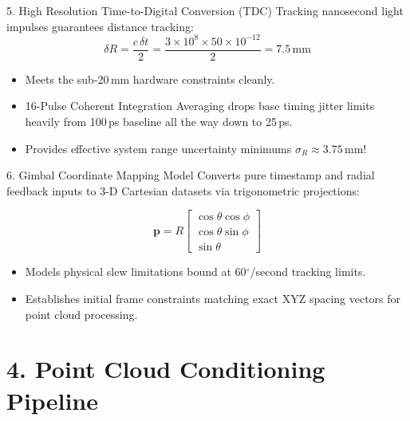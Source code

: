 \documentclass[10pt,aspectratio=169]{beamer}
\begin{document}
\begin{frame}{5. High Resolution Time-to-Digital Conversion (TDC)}
    Tracking nanosecond light impulses guarantees distance tracking:
    \begin{equation}
        \delta R = \frac{c\,\delta t}{2} = \frac{3\times10^8 \times 50\times10^{-12}}{2} = 7.5\,\mathrm{mm}
    \end{equation}
    
    \vspace{3mm}
    \begin{itemize}
        \item Meets the sub-20\,mm hardware constraints cleanly.
        \item 16-Pulse Coherent Integration Averaging drops base timing jitter limits heavily from 100\,ps baseline all the way down to 25\,ps.
        \item Provides effective system range uncertainty minimums $\sigma_R \approx 3.75$\,mm!
    \end{itemize}
\end{frame}

\begin{frame}{6. Gimbal Coordinate Mapping Model}
    Converts pure timestamp and radial feedback inputs to 3-D Cartesian datasets via trigonometric projections:
    
    \begin{equation}
        \mathbf{p} = R
        \begin{bmatrix}
            \cos\theta\cos\phi \\
            \cos\theta\sin\phi \\
            \sin\theta
        \end{bmatrix}
    \end{equation}
    
    \begin{itemize}
        \item Models physical slew limitations bound at 60$^\circ{}$/second tracking limits.
        \item Establishes initial frame constraints matching exact XYZ spacing vectors for point cloud processing.
    \end{itemize}
\end{frame}


\section{4. Point Cloud Conditioning Pipeline}
\end{document}
